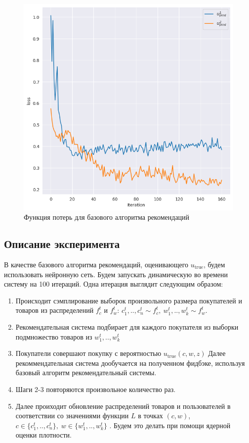 \documentclass{article}
\begin{document}
\begin{figure}[h!]
    \centering
    \includegraphics[width=0.4\linewidth]{images/21_05_exp_uni/loss.png}
    \caption{Функция потерь для базового алгоритма рекомендаций}
    \label{loss}
\end{figure}

\subsection{Описание эксперимента}
В качестве базового алгоритма рекомендаций, оценивающего $u_{\text{true}}$, будем использовать нейронную сеть.
Будем запускать динамическую во времени систему на 100 итераций. Одна итерация выглядит следующим образом:
\begin{enumerate}
\item Происходит сэмплирование выборок произвольного размера покупателей и товаров из распределений $f_c^t$ и $f_w^t$:
$c_1^t,..,c_n^t \sim f_c^t,\ w_1^t,..,w_k^t \sim f_w^t$.
\item Рекомендательная система подбирает для каждого покупателя из выборки подмножество товаров из $w_1^t,..,w_k^t$
\item Покупатели совершают покупку с вероятностью $u_{\text{true}}(c, w, z)$ Далее рекоммендательная система дообучается на полученном фидбэке, используя базовый алгоритм рекомендательный системы.
\item Шаги 2-3 повторяются произвольное количество раз.
\item Далее проиходит обновление распределений товаров и пользователей в соответствии со значениями функции $L$ в точках  $(c, w)$, $c \in \{ c_1^t,..,c_n^t \}, \; w \in \{ w_1^t,..,w_k^t \}$ . Будем это делать при помощи ядерной оценки плотности.
\end{enumerate}
\end{document}
